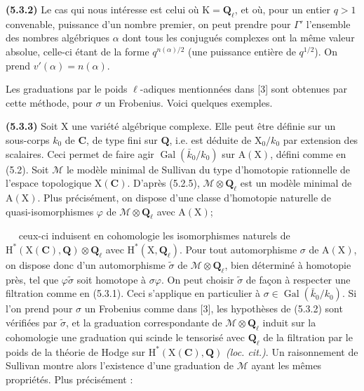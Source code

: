 \documentclass[11pt,leqno]{article}
\newcommand{\Page}[1]{\ifvmode\noindent\else\unskip\ \fi{\footnotesize\textcolor{gray}{[p.\,#1]}}\ \ignorespaces}
\begin{document}
\textbf{(5.3.2)} Le cas qui nous intéresse est celui où \(\mathrm{K}=\mathbf{Q}_{\ell}\), et où, pour un entier \(q>1\) convenable, puissance d’un nombre premier, on peut prendre pour \(\Gamma'\) l’ensemble des nombres algébriques \(\alpha\) dont tous les conjugués complexes ont la même valeur absolue, celle-ci étant de la forme \(q^{n(\alpha)/2}\) (une puissance entière de \(q^{1/2}\)). On prend \(v'(\alpha)=n(\alpha)\).

Les graduations par le poids \(\ell\)-adiques mentionnées dans [3] sont obtenues par cette méthode, pour \(\sigma\) un Frobenius. Voici quelques exemples.

\textbf{(5.3.3)} Soit \(\mathrm{X}\) une variété algébrique complexe. Elle peut être définie sur un sous-corps \(k_0\) de \(\mathbf{C}\), de type fini sur \(\mathbf{Q}\), i.e. est déduite de \(\mathrm{X}_0/k_0\) par extension des scalaires. Ceci permet de faire agir \(\operatorname{Gal}(\bar{k}_0/k_0)\) sur \(\mathrm{A}(\mathrm{X})\), défini comme en (5.2). Soit \(\mathcal{M}\) le modèle minimal de Sullivan du type d’homotopie rationnelle de l’espace topologique \(\mathrm{X}(\mathbf{C})\). D’après (5.2.5), \(\mathcal{M}\otimes\mathbf{Q}_{\ell}\) est un modèle minimal de \(\mathrm{A}(\mathrm{X})\). Plus précisément, on dispose d’une classe d’homotopie naturelle de quasi-isomorphismes \(\varphi\) de \(\mathcal{M}\otimes\mathbf{Q}_{\ell}\) avec \(\mathrm{A}(\mathrm{X})\);

\Page{241}
ceux-ci induisent en cohomologie les isomorphismes naturels de
\(\mathrm{H}^*(\mathrm{X}(\mathbf{C}),\mathbf{Q})\otimes\mathbf{Q}_\ell\)
avec \(\mathrm{H}^*(\mathrm{X},\mathbf{Q}_\ell)\). Pour tout automorphisme
\(\sigma\) de \(\mathrm{A}(\mathrm{X})\), on dispose donc d’un automorphisme
\(\widetilde{\sigma}\) de \(\mathscr{M}\otimes\mathbf{Q}_\ell\), bien déterminé
à homotopie près, tel que \(\varphi\widetilde{\sigma}\) soit homotope à
\(\sigma\varphi\). On peut choisir \(\widetilde{\sigma}\) de façon à respecter
une filtration comme en (5.3.1). Ceci s’applique en particulier à
\(\sigma\in\operatorname{Gal}(\bar{k}_0/k_0)\). Si l’on prend pour \(\sigma\)
un Frobenius comme dans [3], les hypothèses de (5.3.2) sont vérifiées par
\(\widetilde{\sigma}\), et la graduation correspondante de
\(\mathscr{M}\otimes\mathbf{Q}_\ell\) induit sur la cohomologie une graduation
qui scinde le tensorisé avec \(\mathbf{Q}_\ell\) de la filtration par le
poids de la théorie de Hodge sur
\(\mathrm{H}^*(\mathrm{X}(\mathbf{C}),\mathbf{Q})\)
\textit{(loc. cit.)}. Un raisonnement de Sullivan montre alors l’existence
d’une graduation de \(\mathscr{M}\) ayant les mêmes propriétés. Plus
précisément :
\end{document}
